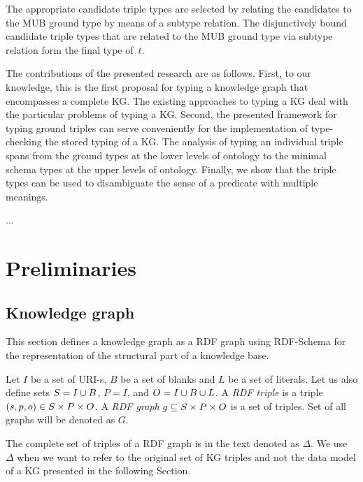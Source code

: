 \documentclass[runningheads]{llncs}
\begin{document}
The appropriate candidate triple types are selected by relating the
candidates to the MUB ground type by means of a subtype relation. The
disjunctively bound candidate triple types that are related to the MUB
ground type via subtype relation form the final type of~$t$.

The contributions of the presented research are as follows. First, to
our knowledge, this is the first proposal for typing a knowledge graph
that encompasses a complete KG. The existing approaches to typing a KG
deal with the particular problems of typing a KG. Second, the
presented framework for typing ground triples can serve conveniently
for the implementation of type-checking the stored typing of a KG. The
analysis of typing an individual triple spans from the ground types at
the lower levels of ontology to the minimal schema types at the upper
levels of ontology. Finally, we show that the triple types can be used
to disambiguate the sense of a predicate with multiple meanings.

...\\





\section{Preliminaries}


\subsection{Knowledge graph\label{sec:kg}}

This section defines a knowledge graph as a RDF graph \cite{rdf} using
RDF-Schema \cite{rdfschema} for the representation of the structural
part of a knowledge base. 

Let $I$ be a set of URI-s, $B$ be a set of blanks and $L$ be a set of
literals. Let us also define sets $S = I\cup\/B$, $P = I$, and
$O = I\cup\/B\cup\/L$. A \emph{RDF triple} is a triple
$(s,p,o)\in\/S\times\/P\times\/O$. A \emph{RDF graph}
$g\subseteq\/S\times\/P\times\/O$ is a set of triples. Set of all
graphs will be denoted as $G$.

The complete set of triples of a RDF graph is in the text denoted as
$\Delta$. We use $\Delta$ when we want to refer to the original set of
KG triples and not the data model of a KG presented in the following
Section.

\end{document}
